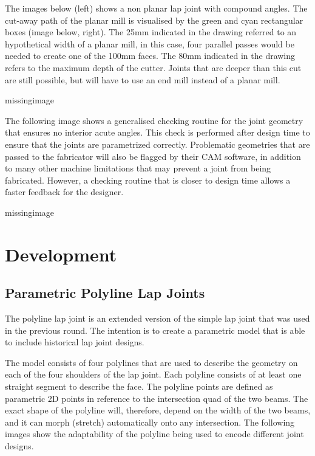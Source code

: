 The images below (left) shows a non planar lap joint with compound angles. The cut-away path of the planar mill is visualised by the green and cyan rectangular boxes (image below, right). The 25mm indicated in the drawing referred to an hypothetical width of a planar mill, in this case, four parallel passes would be needed to create one of the 100mm faces. The 80mm indicated in the drawing refers to the maximum depth of the cutter. Joints that are deeper than this cut are still possible, but will have to use an end mill instead of a planar mill.

missingimage

The following image shows a generalised checking routine for the joint geometry that ensures no interior acute angles. This check is performed after design time to ensure that the joints are parametrized correctly. Problematic geometries that are passed to the fabricator will also be flagged by their CAM software, in addition to many other machine limitations that may prevent a joint from being fabricated. However, a checking routine that is closer to design time allows a faster feedback for the designer.

missingimage

\section{Development}
\label{section:exploration_4_development}

\subsection{Parametric Polyline Lap Joints}
\label{subsection:exploration_4_parametric_polyline_lap_joints}

The polyline lap joint is an extended version of the simple lap joint that was used in the previous round. The intention is to create a parametric model that is able to include historical lap joint designs.

The model consists of four polylines that are used to describe the geometry on each of the four shoulders of the lap joint. Each polyline consists of at least one straight segment to describe the face. The polyline points are defined as parametric 2D points in reference to the intersection quad of the two beams. The exact shape of the polyline will, therefore, depend on the width of the two beams, and it can morph (stretch) automatically onto any intersection. The following images show the adaptability of the polyline being used to encode different joint designs.

